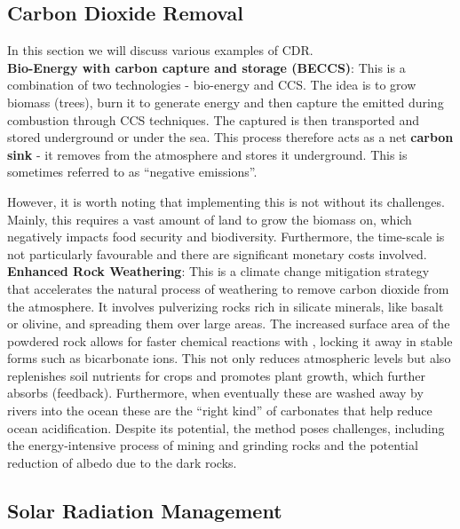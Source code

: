 \subsection{Carbon Dioxide Removal}
\label{sec:CDR}

In this section we will discuss various examples of \gls{CDR}. \\

\noindent \textbf{Bio-Energy with carbon capture and storage (BECCS)}: This is a combination
of two technologies - bio-energy and \gls{CCS}. The idea is to grow biomass (trees), burn
it to generate energy and then capture the  emitted during combustion through 
\gls{CCS} techniques. The captured  is then transported and stored underground
or under the sea. This process therefore acts as a net \textbf{carbon sink} - it removes
 from the atmosphere and stores it underground. This is sometimes referred 
to as ``negative emissions''. 

However, it is worth noting that implementing this is not without its challenges.
Mainly, this requires a vast amount of land to grow the biomass on, which 
negatively impacts food security and biodiversity. Furthermore, the time-scale
is not particularly favourable and there are significant monetary costs involved.\\

\noindent \textbf{Enhanced Rock Weathering}: This is a climate change mitigation 
strategy that accelerates the natural process of weathering to remove carbon 
dioxide from the atmosphere. It involves pulverizing rocks rich in silicate 
minerals, like basalt or olivine, and spreading them over large areas. The 
increased surface area of the powdered rock allows for faster chemical reactions 
with , locking it away in stable forms such as bicarbonate ions. This not 
only reduces atmospheric  levels but also replenishes soil nutrients for 
crops and promotes plant growth, which further absorbs  (feedback). Furthermore,
when eventually these are washed away by rivers into the ocean these are the ``right
kind'' of carbonates that help reduce ocean acidification.
Despite its potential, the method poses challenges, including the energy-intensive 
process of mining and grinding rocks and the potential reduction of albedo due 
to the dark rocks.\\

\subsection{Solar Radiation Management}
\label{sec:SRM}

